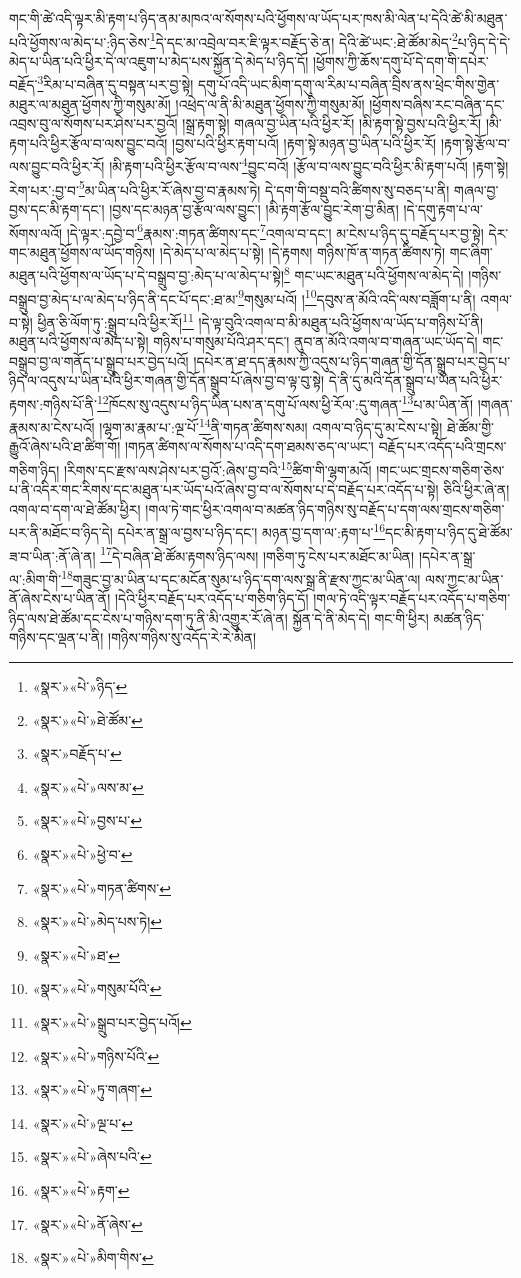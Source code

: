 གང་གི་ཚེ་འདི་ལྟར་མི་རྟག་པ་ཉིད་ནམ་མཁའ་ལ་སོགས་པའི་ཕྱོགས་ལ་ཡོད་པར་ཁས་མི་ལེན་པ་དེའི་ཚེ་མི་མཐུན་པའི་ཕྱོགས་ལ་མེད་པ་:ཉིད་ཅེས་\footnote{«སྣར་»«པེ་»ཉིད་}དེ་དང་མ་འབྲེལ་བར་ཇི་ལྟར་བརྗོད་ཅེ་ན། དེའི་ཚེ་ཡང་:ཐེ་ཚོམ་མེད་\footnote{«སྣར་»«པེ་»ཐེ་ཚོམ་}པ་ཉིད་དེ་དེ་མེད་པ་ཡིན་པའི་ཕྱིར་དེ་ལ་འཇུག་པ་མེད་པས་སྐྱོན་དེ་མེད་པ་ཉིད་དོ། །ཕྱོགས་ཀྱི་ཆོས་དགུ་པོ་དེ་དག་གི་དཔེར་བརྗོད་\footnote{«སྣར་»བརྗོད་པ་}རིམ་པ་བཞིན་དུ་བསྟན་པར་བྱ་སྟེ། དགུ་པོ་འདི་ཡང་མིག་དགུ་ལ་རིམ་པ་བཞིན་བྲིས་ནས་ཕྲེང་གིས་གྱེན་མཐུར་ལ་མཐུན་ཕྱོགས་ཀྱི་གསུམ་མོ། །འཕྲེད་ལ་ནི་མི་མཐུན་ཕྱོགས་ཀྱི་གསུམ་མོ། །ཕྱོགས་བཞིས་རང་བཞིན་དང་འབྲས་བུ་ལ་སོགས་པར་ཤེས་པར་བྱའོ། །སྒྲ་རྟག་སྟེ། གཞལ་བྱ་ཡིན་པའི་ཕྱིར་རོ། །མི་རྟག་སྟེ་བྱས་པའི་ཕྱིར་རོ། །མི་རྟག་པའི་ཕྱིར་རྩོལ་བ་ལས་བྱུང་བའོ། །བྱས་པའི་ཕྱིར་རྟག་པའོ། །རྟག་སྟེ་མཉན་བྱ་ཡིན་པའི་ཕྱིར་རོ། །རྟག་སྟེ་རྩོལ་བ་ལས་བྱུང་བའི་ཕྱིར་རོ། །མི་རྟག་པའི་ཕྱིར་རྩོལ་བ་ལས་\footnote{«སྣར་»«པེ་»ལས་མ་}བྱུང་བའོ། །རྩོལ་བ་ལས་བྱུང་བའི་ཕྱིར་མི་རྟག་པའོ། །རྟག་སྟེ། རེག་པར་:བྱ་བ་\footnote{«སྣར་»«པེ་»བྱས་པ་}མ་ཡིན་པའི་ཕྱིར་རོ་ཞེས་བྱ་བ་རྣམས་ཏེ། དེ་དག་གི་བསྡུ་བའི་ཚིགས་སུ་བཅད་པ་ནི། གཞལ་བྱ་བྱས་དང་མི་རྟག་དང་། །བྱས་དང་མཉན་བྱ་རྩོལ་ལས་བྱུང་། །མི་རྟག་རྩོལ་བྱུང་རེག་བྱ་མིན། །དེ་དགུ་རྟག་པ་ལ་སོགས་ལའོ། །དེ་ལྟར་:དབྱེ་བ་\footnote{«སྣར་»«པེ་»ཕྱེ་བ་}རྣམས་:གཏན་ཚིགས་དང་\footnote{«སྣར་»«པེ་»གཏན་ཚིགས་}འགལ་བ་དང་། མ་ངེས་པ་ཉིད་དུ་བརྗོད་པར་བྱ་སྟེ། དེར་གང་མཐུན་ཕྱོགས་ལ་ཡོད་གཉིས། །དེ་མེད་པ་ལ་མེད་པ་སྟེ། །དེ་རྟགས། གཉིས་ཁོ་ན་གཏན་ཚིགས་ཏེ། གང་ཞིག་མཐུན་པའི་ཕྱོགས་ལ་ཡོད་པ་དེ་བསྒྲུབ་བྱ་:མེད་པ་ལ་མེད་པ་སྟེ།\footnote{«སྣར་»«པེ་»མེད་པས་ཏེ།} གང་ཡང་མཐུན་པའི་ཕྱོགས་ལ་མེད་དེ། །གཉིས་བསྒྲུབ་བྱ་མེད་པ་ལ་མེད་པ་ཉིད་ནི་དང་པོ་དང་:ཐ་མ་\footnote{«སྣར་»«པེ་»ཐ་}གསུམ་པའོ། །\footnote{«སྣར་»«པེ་»གསུམ་པོའི་}དབུས་ན་མོའི་འདི་ལས་བཟློག་པ་ནི། འགལ་བ་སྟེ། ཕྱིན་ཅི་ལོག་ཏུ་:སྒྲུབ་པའི་ཕྱིར་རོ།\footnote{«སྣར་»«པེ་»སྒྲུབ་པར་བྱེད་པའོ།} །དེ་ལྟ་བུའི་འགལ་བ་མི་མཐུན་པའི་ཕྱོགས་ལ་ཡོད་པ་གཉིས་པོ་ནི། མཐུན་པའི་ཕྱོགས་ལ་མེད་པ་སྟེ། གཉིས་པ་གསུམ་པོའི་ཤར་དང་། ནུབ་ན་མོའི་འགལ་བ་གཞན་ཡང་ཡོད་དེ། གང་བསྒྲུབ་བྱ་ལ་གནོད་པ་སྒྲུབ་པར་བྱེད་པའོ། །དཔེར་ན་ཐ་དད་རྣམས་ཀྱི་འདུས་པ་ཉིད་གཞན་གྱི་དོན་སྒྲུབ་པར་བྱེད་པ་ཉིད་ལ་འདུས་པ་ཡིན་པའི་ཕྱིར་གཞན་གྱི་དོན་སྒྲུབ་པོ་ཞེས་བྱ་བ་ལྟ་བུ་སྟེ། དེ་ནི་དུ་མའི་དོན་སྒྲུབ་པ་ཡིན་པའི་ཕྱིར་རྟགས་:གཉིས་པོ་ནི་\footnote{«སྣར་»«པེ་»གཉིས་པོའི་}ཁོངས་སུ་འདུས་པ་ཉིད་ཡིན་པས་ན་དགུ་པོ་ལས་ཕྱི་རོལ་:དུ་གཞན་\footnote{«སྣར་»«པེ་»ཏུ་གཞག་}པ་མ་ཡིན་ནོ། །གཞན་རྣམས་མ་ངེས་པའོ། །ལྷག་མ་རྣམ་པ་:ལྔ་པོ་\footnote{«སྣར་»«པེ་»ལྔ་པ་}ནི་གཏན་ཚིགས་སམ། འགལ་བ་ཉིད་དུ་མ་ངེས་པ་སྟེ། ཐེ་ཚོམ་གྱི་རྒྱུའོ་ཞེས་པའི་ཐ་ཚིག་གོ། །གཏན་ཚིགས་ལ་སོགས་པ་འདི་དག་ཐམས་ཅད་ལ་ཡང་། བརྗོད་པར་འདོད་པའི་གྲངས་གཅིག་ཉིད། །རིགས་དང་རྫས་ལས་ཤེས་པར་བྱའོ་:ཞེས་བྱ་བའི་\footnote{«སྣར་»«པེ་»ཞེས་པའི་}ཚིག་གི་ལྷག་མའོ། །གང་ཡང་གྲངས་གཅིག་ཅེས་པ་ནི་འདིར་གང་རིགས་དང་མཐུན་པར་ཡོད་པའོ་ཞེས་བྱ་བ་ལ་སོགས་པ་དེ་བརྗོད་པར་འདོད་པ་སྟེ། ཅིའི་ཕྱིར་ཞེ་ན། འགལ་བ་དག་ལ་ཐེ་ཚོམ་ཕྱིར། །གལ་ཏེ་གང་ཕྱིར་འགལ་བ་མཚན་ཉིད་གཉིས་སུ་བརྗོད་པ་དག་ལས་གྲངས་གཅིག་པར་ནི་མཐོང་བ་ཉིད་དེ། དཔེར་ན་སྒྲ་ལ་བྱས་པ་ཉིད་དང་། མཉན་བྱ་དག་ལ་:རྟག་པ་\footnote{«སྣར་»«པེ་»རྟག་}དང་མི་རྟག་པ་ཉིད་དུ་ཐེ་ཚོམ་ཟ་བ་ཡིན་:ནོ་ཞེ་ན། \footnote{«སྣར་»«པེ་»ནོ་ཞེས་}དེ་བཞིན་ཐེ་ཚོམ་རྟགས་ཉིད་ལས། །གཅིག་ཏུ་ངེས་པར་མཐོང་མ་ཡིན། །དཔེར་ན་སྒྲ་ལ་:མིག་གི་\footnote{«སྣར་»«པེ་»མིག་གིས་}གཟུང་བྱ་མ་ཡིན་པ་དང་མངོན་སུམ་པ་ཉིད་དག་ལས་སྒྲ་ནི་རྫས་ཀྱང་མ་ཡིན་ལ། ལས་ཀྱང་མ་ཡིན་ནོ་ཞེས་ངེས་པ་ཡིན་ནོ། །དེའི་ཕྱིར་བརྗོད་པར་འདོད་པ་གཅིག་ཉིད་དོ། །གལ་ཏེ་འདི་ལྟར་བརྗོད་པར་འདོད་པ་གཅིག་ཉིད་ལས་ཐེ་ཚོམ་དང་ངེས་པ་གཉིས་དག་ཏུ་ནི་མི་འགྱུར་རོ་ཞེ་ན། སྐྱོན་དེ་ནི་མེད་དེ། གང་གི་ཕྱིར། མཚན་ཉིད་གཉིས་དང་ལྡན་པ་ནི། །གཉིས་གཉིས་སུ་འདོད་རེ་རེ་མིན། 